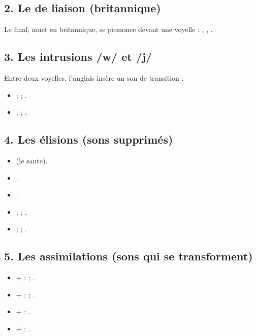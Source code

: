 \subsection{2. Le  de liaison (britannique)}
Le  final, muet en britannique, se prononce devant une voyelle :
 ,  ,
 .

\subsection{3. Les intrusions /w/ et /j/}
Entre deux voyelles, l'anglais insère un son de transition :
\begin{itemize}
  \item {}  ;   ;  .
  \item {}  ;   ;  .
\end{itemize}

\subsection{4. Les élisions (sons supprimés)}
\begin{itemize}
  \item {}  (le  saute).
  \item {} .
  \item {} .
  \item {}  ;   ;  .
  \item {}  ;   ;  .
\end{itemize}

\subsection{5. Les assimilations (sons qui se transforment)}
\begin{itemize}
  \item {} +  \ra {} :   ;  .
  \item {} +  \ra {} :   ;  .
  \item {} +  \ra {} :  .
  \item {} +  \ra {} :  .
\end{itemize}

